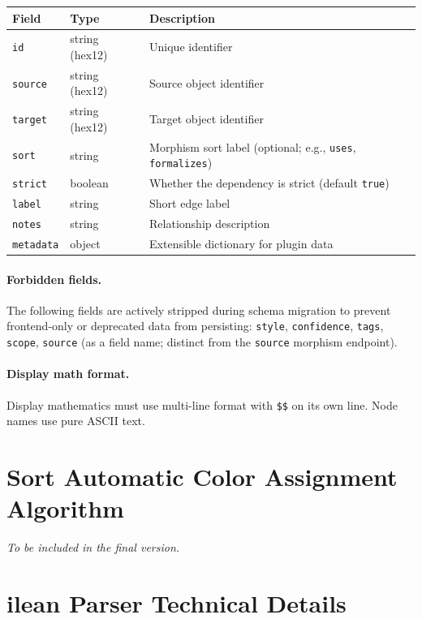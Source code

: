 \begin{table}[h]
\centering
\small
\begin{tabular}{llp{7cm}}
\toprule
Field & Type & Description \\
\midrule
\texttt{id}       & string (hex12) & Unique identifier \\
\texttt{source}   & string (hex12) & Source object identifier \\
\texttt{target}   & string (hex12) & Target object identifier \\
\texttt{sort}     & string         & Morphism sort label (optional; e.g., \texttt{uses}, \texttt{formalizes}) \\
\texttt{strict}   & boolean        & Whether the dependency is strict (default \texttt{true}) \\
\texttt{label}    & string         & Short edge label \\
\texttt{notes}    & string         & Relationship description \\
\texttt{metadata} & object         & Extensible dictionary for plugin data \\
\bottomrule
\end{tabular}
\end{table}

\paragraph{Forbidden fields.} The following fields are actively stripped during schema migration to prevent frontend-only or deprecated data from persisting: \texttt{style}, \texttt{confidence}, \texttt{tags}, \texttt{scope}, \texttt{source} (as a field name; distinct from the \texttt{source} morphism endpoint).

\paragraph{Display math format.} Display mathematics must use multi-line format with \texttt{\$\$} on its own line. Node names use pure ASCII text.


\section{Sort Automatic Color Assignment Algorithm}
\label{sec:app-color}

\emph{To be included in the final version.}


\section{ilean Parser Technical Details}
\label{sec:app-ilean}

